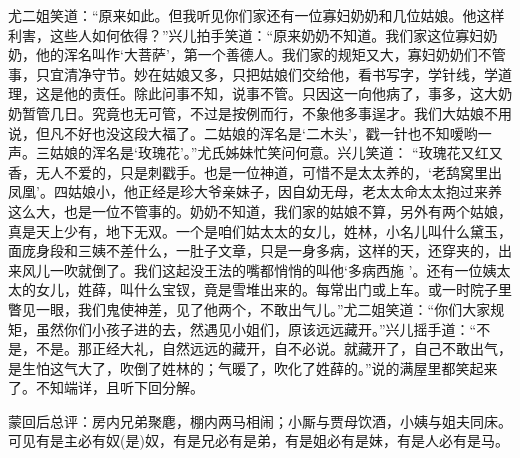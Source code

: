 \begin{parag}


    尤二姐笑道：“原来如此。但我听见你们家还有一位寡妇奶奶和几位姑娘。他这样利害，这些人如何依得？”兴儿拍手笑道：“原来奶奶不知道。我们家这位寡妇奶奶，他的浑名叫作‘大菩萨’，第一个善德人。我们家的规矩又大，寡妇奶奶们不管事，只宜清净守节。妙在姑娘又多，只把姑娘们交给他，看书写字，学针线，学道理，这是他的责任。除此问事不知，说事不管。只因这一向他病了，事多，这大奶奶暂管几日。究竟也无可管，不过是按例而行，不象他多事逞才。我们大姑娘不用说，但凡不好也没这段大福了。二姑娘的浑名是‘二木头’，戳一针也不知嗳哟一声。三姑娘的浑名是‘玫瑰花’。”尤氏姊妹忙笑问何意。兴儿笑道： “玫瑰花又红又香，无人不爱的，只是刺戳手。也是一位神道，可惜不是太太养的，‘老鸹窝里出凤凰’。四姑娘小，他正经是珍大爷亲妹子，因自幼无母，老太太命太太抱过来养这么大，也是一位不管事的。奶奶不知道，我们家的姑娘不算，另外有两个姑娘，真是天上少有，地下无双。一个是咱们姑太太的女儿，姓林，小名儿叫什么黛玉，面庞身段和三姨不差什么，一肚子文章，只是一身多病，这样的天，还穿夹的，出来风儿一吹就倒了。我们这起没王法的嘴都悄悄的叫他‘多病西施 ’。还有一位姨太太的女儿，姓薛，叫什么宝钗，竟是雪堆出来的。每常出门或上车。或一时院子里瞥见一眼，我们鬼使神差，见了他两个，不敢出气儿。”尤二姐笑道：“你们大家规矩，虽然你们小孩子进的去，然遇见小姐们，原该远远藏开。”兴儿摇手道：“不是，不是。那正经大礼，自然远远的藏开，自不必说。就藏开了，自己不敢出气，是生怕这气大了，吹倒了姓林的；气暖了，吹化了姓薛的。”说的满屋里都笑起来了。不知端详，且听下回分解。
\end{parag}

\begin{parag}

    \begin{note}蒙回后总评：房内兄弟聚麀，棚内两马相闹；小厮与贾母饮酒，小姨与姐夫同床。可见有是主必有奴(是)奴，有是兄必有是弟，有是姐必有是妹，有是人必有是马。\end{note}
\end{parag}
